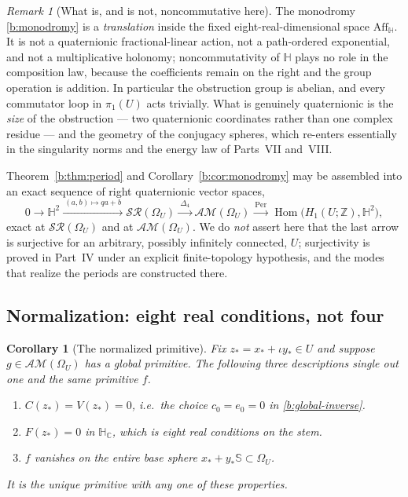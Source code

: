 \documentclass[11pt,a4paper]{article}
\numberwithin{equation}{section}
\newtheorem{corollary}[theorem]{Corollary}
\theoremstyle{definition}
\theoremstyle{remark}
\newtheorem{remark}[theorem]{Remark}
\theoremstyle{plain}
\newcommand{\HH}{\mathbb H}
\newcommand{\HC}{\mathbb H_{\mathbb C}}
\newcommand{\ZZ}{\mathbb Z}
\newcommand{\SSS}{\mathbb S}
\newcommand{\lap}{\Delta_4}
\newcommand{\SR}{\mathcal{SR}}
\newcommand{\AM}{\mathcal{AM}}
\newcommand{\Om}{\Omega}
\newcommand{\Aff}{\mathrm{Aff}_{\HH}}
\newcommand{\Per}{\mathrm{Per}}
\newcommand{\pot}{C}          %
\newcommand{\potV}{V}         %
\begin{document}
\begin{remark}[What is, and is not, noncommutative here]
\label{b:rem:abelian}
The monodromy \eqref{b:monodromy} is a \emph{translation} inside the fixed
eight-real-dimensional space $\Aff$.  It is not a quaternionic
fractional-linear action, not a path-ordered exponential, and not a
multiplicative holonomy; noncommutativity of $\HH$ plays no role in the
composition law, because the coefficients remain on the right and the group
operation is addition.  In particular the obstruction group is abelian, and
every commutator loop in $\pi_1(U)$ acts trivially.  What is genuinely
quaternionic is the \emph{size} of the obstruction --- two quaternionic
coordinates rather than one complex residue --- and the geometry of the
conjugacy spheres, which re-enters essentially in the singularity norms and
the energy law of Parts~VII and~VIII.
\end{remark}

Theorem~\ref{b:thm:period} and Corollary~\ref{b:cor:monodromy} may be
assembled into an exact sequence of right quaternionic vector spaces,
\begin{equation}
 0\longrightarrow\HH^2\xrightarrow{\ (a,b)\mapsto qa+b\ }
 \SR(\Om_U)\xrightarrow{\ \lap\ }\AM(\Om_U)
 \xrightarrow{\ \Per\ }\operatorname{Hom}\bigl(H_1(U;\ZZ),\HH^2\bigr),
 \label{b:exact-general}
\end{equation}
exact at $\SR(\Om_U)$ and at $\AM(\Om_U)$.  We do \emph{not} assert here that
the last arrow is surjective for an arbitrary, possibly infinitely connected,
$U$; surjectivity is proved in Part~IV under an explicit finite-topology
hypothesis, and the modes that realize the periods are constructed there.

\subsection{Normalization: eight real conditions, not four}
\label{b:sub:normalization}

\begin{corollary}[The normalized primitive]
\label{b:cor:normalization}
Fix $z_*=x_*+\iota y_*\in U$ and suppose $g\in\AM(\Om_U)$ has a global
primitive.  The following three descriptions single out one and the same
primitive $f$.
\begin{enumerate}[label=\textup{(\alph*)}]
\item $\pot(z_*)=\potV(z_*)=0$, i.e.\ the choice $c_0=e_0=0$ in
\eqref{b:global-inverse}.
\item $F(z_*)=0$ in $\HC$, which is eight real conditions on the stem.
\item $f$ vanishes on the entire base sphere $x_*+y_*\SSS\subset\Om_U$.
\end{enumerate}
It is the unique primitive with any one of these properties.
\end{corollary}
\end{document}
